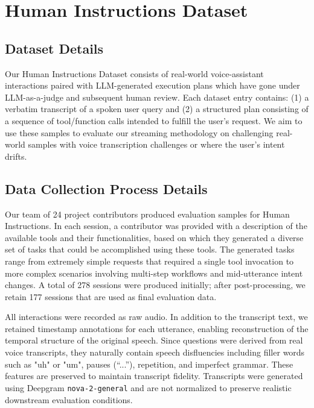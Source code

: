 \section{Human Instructions Dataset}
\label{sec:appendix_human_dataset}
\subsection{Dataset Details}

Our Human Instructions Dataset consists of real-world voice-assistant interactions paired with LLM-generated execution plans which have gone under LLM-as-a-judge and subsequent human review. Each dataset entry contains: (1) a verbatim transcript of a spoken user query and (2) a structured plan consisting of a sequence of tool/function calls intended to fulfill the user’s request. 
We aim to use these samples to evaluate our streaming methodology on challenging real-world samples with voice transcription challenges or where the user's intent drifts. 

\subsection{Data Collection Process Details}

Our team of 24 project contributors produced evaluation samples for Human Instructions. 
In each session, a contributor was provided with a description of the available tools and their functionalities, based on which they generated a diverse set of tasks that could be accomplished using these tools.
The generated tasks range from extremely simple requests that required a single tool invocation to more complex scenarios involving multi-step workflows and mid-utterance intent changes. 
A total of 278 sessions were produced initially; after post-processing, we retain 177 sessions that are used as final evaluation data.

All interactions were recorded as raw audio. In addition to the transcript text, we retained timestamp annotations for each utterance, enabling reconstruction of the temporal structure of the original speech.
Since questions were derived from real voice transcripts, they naturally contain speech disfluencies including filler words such as "uh" or "um", pauses (``...''), repetition, and imperfect grammar. These features are preserved to maintain transcript fidelity. Transcripts were generated using Deepgram \texttt{nova-2-general} and are not normalized to preserve realistic downstream evaluation conditions. 

